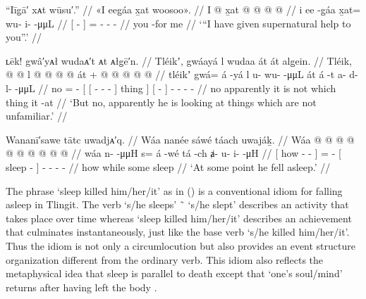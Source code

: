 \ex\label{ex:90-17-supernatural-help}%
%
\begingl
	\glpreamble	“Iīg̣ā′ xᴀt wūsu′.” //
	\glpreamble	«\!I eeg̱áa x̱at woosoo\!». //
	\gla	{} I  @ {} {}
		x̱at @  @ {} @ {} @ {} //
	\glb	{} i ee -g̱áa {}
		x̱at= wu- i-  -μμL //
	\glc	{}[   - {}]
		= - -  - //
	\gld	{} you {} -for {}
		me  {} {} {} //
	\glft	‘“I have given supernatural help to you”.’
		//
\endgl
\xe

\ex\label{ex:90-18-unfamiliar}%
%
\begingl
	\glpreamble	 ʟēk! gwâ′yᴀł wudaᴀ′t ᴀt ᴀłg̣ē′n. //
	\glpreamble	Tléikʼ, gwáayá l wudaa át át alg̱ein. //
	\gla	Tléik,  @ {} @ {}
		{} {} l  @ {} @ {} @ {} @ {} {} át {} +
		{}  @ {} {}
		 @ {} @ {} @ {} @ {} //
	\glb	tléikʼ gwá= á -yá
		{} {} l u- wu-  -μμL {} {} át {}
		{} á -t {} 
		a- d- l-  -μμL  //
	\glc	no =  -
		{}[ {}[  - -  - \· {}] thing {}]
		{}[  - {}]
		- - -  - //
	\gld	no apparently\· it is
		{} {} not  {} {} {} \·which {} thing {}
		{} it -at {}
		 {} {} {} {} //
	\glft	‘But no, apparently he is looking at things which are not unfamiliar.’
		//
\endgl
\xe

\ex\label{ex:90-19-sleep-kills}%
%
\begingl
	\glpreamble	Wananī′sawe tātc uwadjᴀ′q. //
	\glpreamble	Wáa nanée sáwé táach uwajáḵ. //
	\gla	{} Wáa  @ {} @ {} @ {} {}
		 @ {} @ {}
		{}  @ {} {}
		 @ {} @ {} @ {} @ {} //
	\glb	{} wáa n-  -μμH {} {} 
		s= á -wé
		{} tá -ch {}
		ⱥ- u- i-  -μH //
	\glc	{}[ how -  - \· {}]
		=  -
		{}[ sleep - {}]
		- - -  - //
	\gld	{} how  {} {} \·while {}
		some\·  {}
		{} sleep {} {}
		 {} {} {} {} //
	\glft	‘At some point he fell asleep.’
		//
\endgl
\xe

The phrase  ‘sleep killed him/her/it’ as in (\lastx) is a conventional idiom for falling asleep in Tlingit.
The verb  ‘s/he sleeps’ \~\  ‘s/he slept’ describes an activity that takes place over time whereas  ‘sleep killed him/her/it’ describes an achievement that culminates instantaneously, just like the base verb  ‘s/he killed him/her/it’.
Thus the idiom is not only a circumlocution but also provides an event structure organization different from the ordinary verb.
This idiom also reflects the  metaphysical idea that sleep is parallel to death except that  ‘one’s soul/mind’ returns after having left the body \parencites[759]{de-laguna:1972}[56, 105]{kan:2016}.

